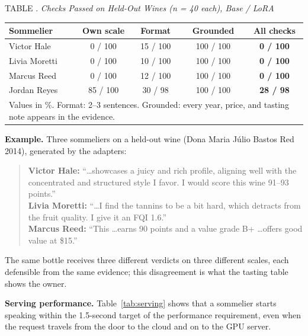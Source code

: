 \documentclass[conference]{IEEEtran}
\begin{document}
\par\smallskip
\noindent\begin{minipage}{\columnwidth}
\centering
{}\label{tab:lora-eval}
{\footnotesize TABLE . \textit{Checks Passed on Held-Out Wines (n = 40 each), Base / LoRA}\par}
\smallskip
\scriptsize
\setlength{\tabcolsep}{2.5pt}
\begin{tabular}{|l|c|c|c|c|}
\hline
Sommelier & Own scale & Format & Grounded & All checks \\
\hline Victor Hale & 0 / 100 & 15 / 100 & 100 / 100 & \textbf{0 / 100} \\
\hline Livia Moretti & 0 / 100 & 10 / 100 & 100 / 100 & \textbf{0 / 100} \\
\hline Marcus Reed & 0 / 100 & 12 / 100 & 100 / 100 & \textbf{0 / 100} \\
\hline Jordan Reyes & 85 / 100 & 30 / 98 & 100 / 100 & \textbf{28 / 98} \\
\hline
\multicolumn{5}{p{0.95\columnwidth}}{\scriptsize Values in \%. Format: 2--3 sentences. Grounded: every year, price, and tasting note appears in the evidence.}
\end{tabular}
\end{minipage}\par\smallskip
\textbf{Example.} Three sommeliers on a held-out wine (Dona Maria J\'ulio Bastos Red 2014), generated by the adapters:
\begin{quote}\footnotesize
\textbf{Victor Hale:} ``\ldots showcases a juicy and rich profile, aligning well with the concentrated and structured style I favor. I would score this wine 91--93 points.''\\
\textbf{Livia Moretti:} ``\ldots I find the tannins to be a bit hard, which detracts from the fruit quality. I give it an FQI 1.6.''\\
\textbf{Marcus Reed:} ``This \ldots earns 90 points and a value grade B+ \ldots offers good value at \$15.''
\end{quote}
The same bottle receives three different verdicts on three different scales, each defensible from the same evidence; this disagreement is what the tasting table shows the owner.

\textbf{Serving performance.} Table~\ref{tab:serving} shows that a sommelier starts speaking within the 1.5-second target of the performance requirement, even when the request travels from the door to the cloud and on to the GPU server.
\end{document}
